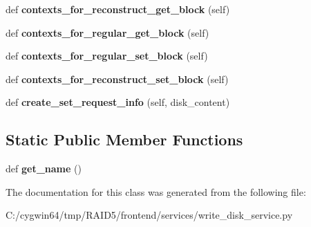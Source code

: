 \begin{DoxyCompactItemize}
def {\bfseries contexts\+\_\+for\+\_\+reconstruct\+\_\+get\+\_\+block} (self)
\item 
\mbox{\label{class_r_a_i_d5_1_1frontend_1_1services_1_1write__disk__service_1_1_write_to_disk_service_ae580905ee78f7c6de6e0ade140263bca}} 
def {\bfseries contexts\+\_\+for\+\_\+regular\+\_\+get\+\_\+block} (self)
\item 
\mbox{\label{class_r_a_i_d5_1_1frontend_1_1services_1_1write__disk__service_1_1_write_to_disk_service_aee27da3cbe224018b18df3ed0e3c56bf}} 
def {\bfseries contexts\+\_\+for\+\_\+regular\+\_\+set\+\_\+block} (self)
\item 
\mbox{\label{class_r_a_i_d5_1_1frontend_1_1services_1_1write__disk__service_1_1_write_to_disk_service_ae04f93ddddb2b4dbf894d4f7aa73fbdc}} 
def {\bfseries contexts\+\_\+for\+\_\+reconstruct\+\_\+set\+\_\+block} (self)
\item 
\mbox{\label{class_r_a_i_d5_1_1frontend_1_1services_1_1write__disk__service_1_1_write_to_disk_service_a22d9b97ab2de2bd8f79f9275a9515971}} 
def {\bfseries create\+\_\+set\+\_\+request\+\_\+info} (self, disk\+\_\+content)
\end{DoxyCompactItemize}
\subsection*{Static Public Member Functions}
\begin{DoxyCompactItemize}
\item 
\mbox{\label{class_r_a_i_d5_1_1frontend_1_1services_1_1write__disk__service_1_1_write_to_disk_service_a36546dcbe697f726ee0434d65b2ff8c4}} 
def {\bfseries get\+\_\+name} ()
\end{DoxyCompactItemize}


The documentation for this class was generated from the following file\+:\begin{DoxyCompactItemize}
\item 
C\+:/cygwin64/tmp/\+R\+A\+I\+D5/frontend/services/write\+\_\+disk\+\_\+service.\+py\end{DoxyCompactItemize}
